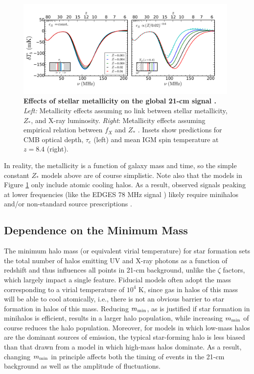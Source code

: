 \begin{figure}[]
\begin{center}
\includegraphics[width=0.98\textwidth]{Mirocha/mirocha2017_fig5.pdf}
\end{center}
\caption{{\bf Effects of stellar metallicity on the global 21-cm signal \cite{Mirocha2017}.} \textit{Left:} Metallicity effects assuming no link between stellar metallicity, $Z_{\ast}$, and X-ray luminosity. \textit{Right}: Metallicity effects assuming empirical relation between $f_X$ and $Z_{\ast}$ \cite{Brorby2016}. Insets show predictions for CMB optical depth, $\tau_e$ (left) and mean IGM spin temperature at $z=8.4$ (right).}
\label{fig:gs_metallicity}
\end{figure}

In reality, the metallicity is a function of galaxy mass and time, so the simple constant $Z_{\ast}$ models above are of course simplistic. Note also that the models in Figure \ref{fig:gs_metallicity} only include atomic cooling halos. As a result, observed signals peaking at lower frequencies (like the EDGES 78 MHz signal \cite{Bowman2018}) likely require minihalos and/or non-standard source prescriptions \cite{Mirocha2018,Mirocha2019}.

\subsection{Dependence on the Minimum Mass}
The minimum halo mass (or equivalent virial temperature) for star formation sets the total number of halos emitting UV and X-ray photons as a function of redshift and thus influences all points in 21-cm background, unlike the $\zeta$ factors, which largely impact a single feature. Fiducial models often adopt the mass corresponding to a virial temperature of $10^4$ K, since gas in halos of this mass will be able to cool atomically, i.e., there is not an obvious barrier to star formation in halos of this mass. Reducing $m_{\text{min}}$, as is justified if star formation in minihalos is efficient, results in a larger halo population, while increasing $m_{\text{min}}$ of course reduces the halo population. Moreover, for models in which low-mass halos are the dominant sources of emission, the typical star-forming halo is less biased than that drawn from a model in which high-mass halos dominate. As a result, changing $m_{\text{min}}$ in principle affects both the timing of events in the 21-cm background as well as the amplitude of fluctuations. 

